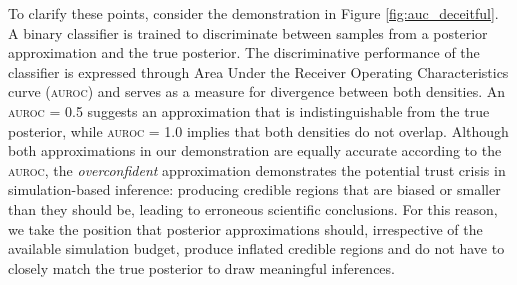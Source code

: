 \documentclass[twoside]{article}
\begin{document}
To clarify these points, consider the demonstration in Figure \ref{fig:auc_deceitful}.
A binary classifier is trained to discriminate between samples from a posterior approximation and the true posterior.
The discriminative performance of the classifier is expressed through Area Under the Receiver Operating Characteristics curve (\textsc{auroc}) and serves as a measure for divergence between both densities. An \textsc{auroc} = 0.5 suggests an approximation that is indistinguishable from the true posterior, while \textsc{auroc} = 1.0 implies that both densities do not overlap.
Although both approximations in our demonstration are equally accurate according to the \textsc{auroc}, the \emph{overconfident} approximation demonstrates the potential trust crisis in simulation-based inference:
producing credible regions that are biased or smaller than they should be, leading to erroneous scientific conclusions.
For this reason, we take the position that posterior approximations should, irrespective of the available simulation budget, produce inflated credible regions and do not have to closely match the true posterior to draw meaningful inferences.
\end{document}
